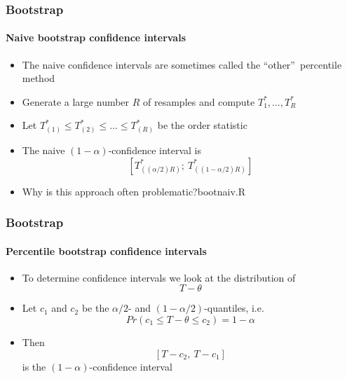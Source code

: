 \documentclass[smaller,compress]{beamer}
\begin{document}
\begin{frame}\frametitle{Bootstrap}\framesubtitle{Naive bootstrap confidence intervals}
\begin{itemize}
    \item The naive confidence intervals are sometimes called the \textquotedblleft other\textquotedblright\ percentile method
    \item Generate a large number $R$ of resamples and compute $T_{1}^{\ast },\ldots ,T_{R}^{\ast }$
    \item Let $T_{(1)}^{\ast }\leq T_{(2)}^{\ast }\leq \ldots \leq T_{(R)}^{\ast }$ be the order statistic
    \item The naive $\left( 1-\alpha \right) $-confidence interval is
    \begin{equation*}
    \left[ T_{(\left( \alpha /2\right) R)}^{\ast };\ T_{((1-\alpha /2)R)}^{\ast }\right]
    \end{equation*}
    \item Why is this approach often problematic?\hfill {\tiny bootnaiv.R}
\end{itemize}
\end{frame}


\begin{frame}\frametitle{Bootstrap}\framesubtitle{Percentile bootstrap confidence intervals}
\begin{itemize}
    \item To determine confidence intervals we look at the distribution of
    \begin{equation*}
    T-\theta
    \end{equation*}
    \item Let $c_{1}$ and $c_{2}$ be the $\alpha /2$- and $\left( 1-\alpha/2\right) $-quantiles, i.e.
    \begin{equation*}
    Pr\left( c_{1}\leq T-\theta \leq c_{2}\right) =1-\alpha
    \end{equation*}
    \item Then
    \begin{equation*}
    \left[ T-c_{2},\ T-c_{1}\right]
    \end{equation*}
    is the $\left( 1-\alpha \right) $-confidence interval
\end{itemize}
\end{frame}
\end{document}
